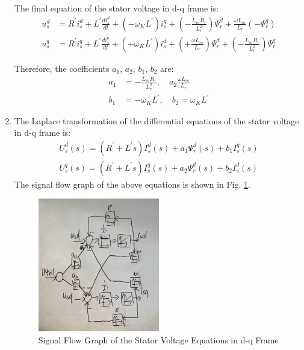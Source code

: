 \documentclass[12pt,a4paper, openany]{book}
\begin{document}
\begin{enumerate}
The final equation of the stator voltage in d-q frame is:
\begin{equation}
    \begin{aligned}
        u_s^d&=R^{\prime}i_s^d+L^{\prime}\frac{di_s^d}{dt}+\left(-\omega_KL^{\prime}\right)i_s^q+\left(-\frac{L_mR_r}{L_r^2}\right)\Psi_r^d+\frac{\omega L_m}{L_r}(-\Psi_r^q)\\
        u_s^q&=R^{\prime}i_s^q+L^{\prime}\frac{di_s^q}{dt}+\left(+\omega_KL^{\prime}\right)i_s^d+\left(+\frac{\omega L_m}{L_r}\right)\Psi_r^d+\left(-\frac{L_mR_r}{L_r^2}\right)\Psi_r^q
    \end{aligned}
\end{equation}

Therefore,  the coefficients $a_1$, $a_2$, $b_1$, $b_2$ are:
\begin{equation}
    \begin{aligned}
        a_1&=-\frac{L_mR_r}{L_r^2},\quad a_2\frac{\omega L_m}{L_r}\\
        b_1&=-\omega_KL^{\prime},\quad b_2=\omega_KL^{\prime}
    \end{aligned}
\end{equation}
\item 
The Laplace transformation of the differential equations of the stator voltage in d-q frame is:
\begin{equation}
    \begin{aligned}
        U_{s}^d(s)=\left(R^{\prime}+L^{\prime}s\right)I_{s}^d(s)+a_1\Psi_r^d(s)+b_1I_s^q(s)\\
        U_{s}^q(s)=\left(R^{\prime}+L^{\prime}s\right)I_{s}^q(s)+a_2\Psi_r^d(s)+b_2I_s^d(s)
    \end{aligned}
\end{equation}
The signal flow graph of the above equations is shown in Fig. \ref{fig:signal_flow_graph}.
\begin{figure}[H]
    \centering
    \includegraphics[width=0.5\textwidth]{figures/signal_flow_graph.png}
    \caption{Signal Flow Graph of the Stator Voltage Equations in d-q Frame}
    \label{fig:signal_flow_graph}
\end{figure}


\end{enumerate}
\end{document}
